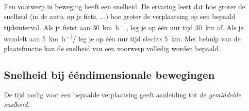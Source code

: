 \documentclass{ximera}
\begin{document}
	\author{Bart Lambregs,Vincent Gellens}
    \xmsource\xmuitleg



   
  
  
  
  




Een voorwerp in beweging heeft een snelheid. 
De ervaring leert dat hoe groter de snelheid (in de auto, op je fiets, ...) hoe groter de verplaatsing op een bepaald tijdsinterval. 
Als je fietst aan \SI{30}{\kilo\meter\per\hour}, leg je op één uur tijd \SI{30}{km} af. 
Als je wandelt aan \SI{5}{\kilo\meter\per\hour}/ leg je op één uur tijd slechts \SI{5}{km}. 
Met behulp van de plaatsfunctie kan de snelheid van een voorwerp volledig worden bepaald. 





\subsection*{Snelheid bij ééndimensionale bewegingen}



De tijd nodig voor een bepaalde verplaatsing geeft aanleiding tot de \textit{gemiddelde snelheid}. 

\end{document}
